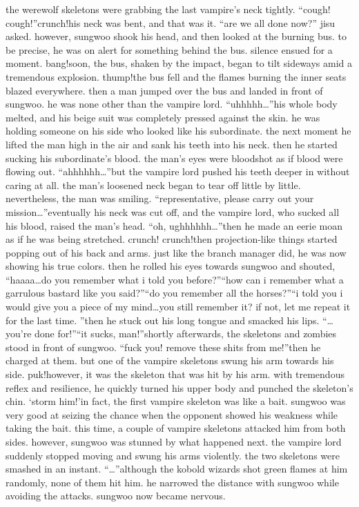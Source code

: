 the werewolf skeletons were grabbing the last vampire’s neck tightly.
“cough! cough!”crunch!his neck was bent, and that was it.
“are we all done now?” jisu asked.
however, sungwoo shook his head, and then looked at the burning bus.
 to be precise, he was on alert for something behind the bus.
 silence ensued for a moment.
bang!soon, the bus, shaken by the impact, began to tilt sideways amid a tremendous explosion.
thump!the bus fell and the flames burning the inner seats blazed everywhere.
 then a man jumped over the bus and landed in front of sungwoo.
 he was none other than the vampire lord.
“uhhhhh…”his whole body melted, and his beige suit was completely pressed against the skin.
he was holding someone on his side who looked like his subordinate.
 the next moment he lifted the man high in the air and sank his teeth into his neck.
then he started sucking his subordinate’s blood.
 the man’s eyes were bloodshot as if blood were flowing out.
“ahhhhhh…”but the vampire lord pushed his teeth deeper in without caring at all.
 the man’s loosened neck began to tear off little by little.
 nevertheless, the man was smiling.
“representative, please carry out your mission…”eventually his neck was cut off, and the vampire lord, who sucked all his blood, raised the man’s head.
“oh, ughhhhhh…”then he made an eerie moan as if he was being stretched.
crunch! crunch!then projection-like things started popping out of his back and arms.
 just like the branch manager did, he was now showing his true colors.
 then he rolled his eyes towards sungwoo and shouted, “haaaa…do you remember what i told you before?”“how can i remember what a garrulous bastard like you said?”“do you remember all the horses?”“i told you i would give you a piece of my mind…you still remember it? if not, let me repeat it for the last time.
”then he stuck out his long tongue and smacked his lips.
“…you’re done for!”“it sucks, man!”shortly afterwards, the skeletons and zombies stood in front of sungwoo.
“fuck you! remove these shits from me!”then he charged at them.
 but one of the vampire skeletons swung his arm towards his side.
puk!however, it was the skeleton that was hit by his arm.
 with tremendous reflex and resilience, he quickly turned his upper body and punched the skeleton’s chin.
‘storm him!’in fact, the first vampire skeleton was like a bait.
 sungwoo was very good at seizing the chance when the opponent showed his weakness while taking the bait.
this time, a couple of vampire skeletons attacked him from both sides.
 however, sungwoo was stunned by what happened next.
 the vampire lord suddenly stopped moving and swung his arms violently.
 the two skeletons were smashed in an instant.
“…”although the kobold wizards shot green flames at him randomly, none of them hit him.
he narrowed the distance with sungwoo while avoiding the attacks.
 sungwoo now became nervous.



